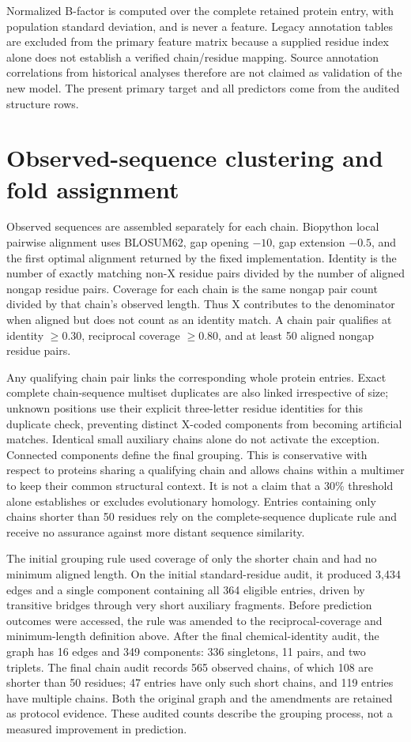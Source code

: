 \documentclass[10pt]{article}
\begin{document}
Normalized B-factor is computed over the complete retained protein entry, with population standard deviation, and is never a feature. Legacy annotation tables are excluded from the primary feature matrix because a supplied residue index alone does not establish a verified chain/residue mapping. Source annotation correlations from historical analyses therefore are not claimed as validation of the new model. The present primary target and all predictors come from the audited structure rows.

\section{Observed-sequence clustering and fold assignment}
Observed sequences are assembled separately for each chain. Biopython local pairwise alignment uses BLOSUM62, gap opening $-10$, gap extension $-0.5$, and the first optimal alignment returned by the fixed implementation. Identity is the number of exactly matching non-X residue pairs divided by the number of aligned nongap residue pairs. Coverage for each chain is the same nongap pair count divided by that chain's observed length. Thus X contributes to the denominator when aligned but does not count as an identity match. A chain pair qualifies at identity $\geq0.30$, reciprocal coverage $\geq0.80$, and at least 50 aligned nongap residue pairs.

Any qualifying chain pair links the corresponding whole protein entries. Exact complete chain-sequence multiset duplicates are also linked irrespective of size; unknown positions use their explicit three-letter residue identities for this duplicate check, preventing distinct X-coded components from becoming artificial matches. Identical small auxiliary chains alone do not activate the exception. Connected components define the final grouping. This is conservative with respect to proteins sharing a qualifying chain and allows chains within a multimer to keep their common structural context. It is not a claim that a 30\% threshold alone establishes or excludes evolutionary homology. Entries containing only chains shorter than 50 residues rely on the complete-sequence duplicate rule and receive no assurance against more distant sequence similarity.

The initial grouping rule used coverage of only the shorter chain and had no minimum aligned length. On the initial standard-residue audit, it produced 3,434 edges and a single component containing all 364 eligible entries, driven by transitive bridges through very short auxiliary fragments. Before prediction outcomes were accessed, the rule was amended to the reciprocal-coverage and minimum-length definition above. After the final chemical-identity audit, the graph has 16 edges and 349 components: 336 singletons, 11 pairs, and two triplets. The final chain audit records 565 observed chains, of which 108 are shorter than 50 residues; 47 entries have only such short chains, and 119 entries have multiple chains. Both the original graph and the amendments are retained as protocol evidence. These audited counts describe the grouping process, not a measured improvement in prediction.
\end{document}

